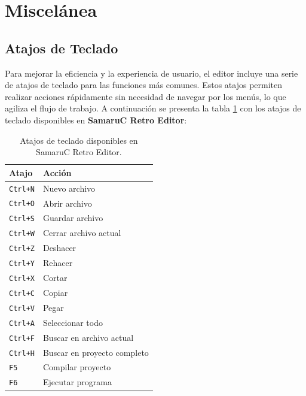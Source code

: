 \documentclass[../../main.tex]{subfiles}
\begin{document}
 \clearpage
\section{Miscelánea}

\subsection{Atajos de Teclado}

\par{Para mejorar la eficiencia y la experiencia de usuario, el editor incluye una serie de atajos de teclado para las funciones más comunes. Estos atajos permiten realizar acciones rápidamente sin necesidad de navegar por los menús, lo que agiliza el flujo de trabajo. A continuación se presenta la tabla \ref{tab:atajos_teclado_completa} con los atajos de teclado disponibles en \textbf{SamaruC Retro Editor}:}
\begin{table}[ht]
    \centering
    \small
    \begin{tabular}{p{3cm}p{6cm}}
        \toprule
            \textbf{Atajo} & \textbf{Acción} \\
        \midrule
            \lstinline|Ctrl+N| & Nuevo archivo \\
            \lstinline|Ctrl+O| & Abrir archivo \\
            \lstinline|Ctrl+S| & Guardar archivo \\
            \lstinline|Ctrl+W| & Cerrar archivo actual \\
            \lstinline|Ctrl+Z| & Deshacer \\
            \lstinline|Ctrl+Y| & Rehacer \\
            \lstinline|Ctrl+X| & Cortar \\
            \lstinline|Ctrl+C| & Copiar \\
            \lstinline|Ctrl+V| & Pegar \\
            \lstinline|Ctrl+A| & Seleccionar todo \\
            \lstinline|Ctrl+F| & Buscar en archivo actual \\
            \lstinline|Ctrl+H| & Buscar en proyecto completo \\
            \lstinline|F5| & Compilar proyecto \\
            \lstinline|F6| & Ejecutar programa \\
        \bottomrule
    \end{tabular}
    \caption{Atajos de teclado disponibles en SamaruC Retro Editor.}
    \label{tab:atajos_teclado_completa}
\end{table}
\end{document}

